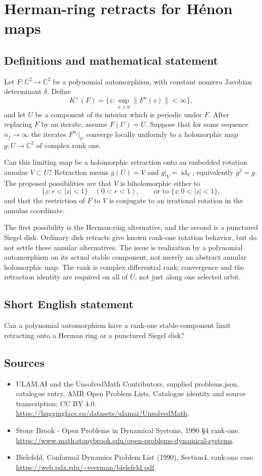 \documentclass[11pt,a4paper]{article}
\begin{document}
\section*{Herman-ring retracts for Hénon maps}\label{statement}

\subsection{Definitions and mathematical statement}
Let $F:\mathbb C^2\to\mathbb C^2$ be a polynomial automorphism,
with constant nonzero Jacobian determinant $\delta$. Define
\[
 K^+(F)=\{z:\sup_{n\ge0}\|F^n(z)\|<\infty\},
\]
and let $U$ be a component of its interior which is periodic under
$F$. After replacing $F$ by an iterate, assume $F(U)=U$.
Suppose that for some sequence $n_j\to\infty$ the iterates
$F^{n_j}|_U$ converge locally uniformly to a holomorphic map
$g:U\to\mathbb C^2$ of complex rank one.

Can this limiting map be a holomorphic retraction onto an embedded
rotation annulus $V\subset U$? Retraction means $g(U)=V$ and
$g|_V=\operatorname{id}_V$, equivalently $g^2=g$. The proposed
possibilities are that $V$ is biholomorphic either to
\[
 \{z:r<|z|<1\}\quad(0<r<1),
 \qquad\text{or to }\{z:0<|z|<1\},
\]
and that the restriction of $F$ to $V$ is conjugate to an irrational
rotation in the annulus coordinate.

The first possibility is the Herman-ring alternative, and the
second is a punctured Siegel disk. Ordinary disk retracts give
known rank-one rotation behavior, but do not settle these annular
alternatives. The issue is realization by a polynomial automorphism
on its actual stable component, not merely an abstract annular
holomorphic map. The rank is complex differential rank; convergence
and the retraction identity are required on all of $U$, not just
along one selected orbit.
\subsection{Short English statement}
Can a polynomial automorphism have a rank-one stable-component limit retracting onto a Herman ring or a punctured Siegel disk?
\subsection{Sources}
\begin{itemize}
\item[S1] ULAM.AI and the UnsolvedMath Contributors, supplied problems.json, catalogue entry, AMR Open Problem Lists. Catalogue identity and source transcription; CC BY 4.0.
\url{https://huggingface.co/datasets/ulamai/UnsolvedMath}.
\item[S2] Stony Brook - Open Problems in Dynamical Systems, 1990 §4 rank-one. 
\url{https://www.math.stonybrook.edu/open-problems-dynamical-systems}.
\item[S3] Bielefeld, Conformal Dynamics Problem List (1990), Section4, rank-one case.
\url{https://web.pdx.edu/~veerman/bielefeld.pdf}.
\end{itemize}
\end{document}
